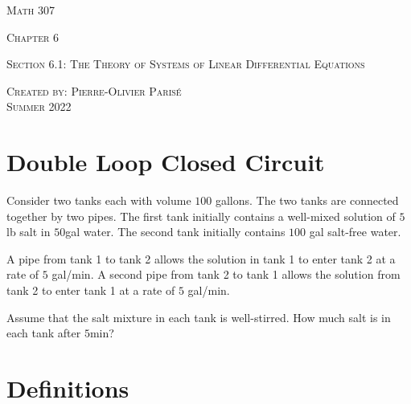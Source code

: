 \documentclass[12pt,a4paper]{article}
\newcounter{example}[section]
\begin{document}
\thispagestyle{empty}

\begin{center}
\vspace*{2.5cm}

{\Huge \textsc{Math 307}}

\vspace*{2cm}

{\LARGE \textsc{Chapter 6}} 

\vspace*{0.75cm}

\noindent\textsc{Section 6.1: The Theory of Systems of Linear Differential Equations}

\vspace*{0.75cm}

\tableofcontents

\vfill

\noindent \textsc{Created by: Pierre-Olivier Paris{\'e}} \\
\textsc{Summer 2022}
\end{center}

\newpage

\section{Double Loop Closed Circuit}

\begin{example}
Consider two tanks each with volume $100$ gallons. The two tanks are connected together by two pipes. The first tank initially contains a well-mixed solution of $5$lb salt in $50$gal water. The second tank initially contains $100$ gal salt-free water. 

A pipe from tank 1 to tank 2 allows the solution in tank 1 to enter tank 2 at a rate of $5$ gal/min. A second pipe from tank 2 to tank 1 allows the solution from tank 2 to enter tank 1 at a rate of $5$ gal/min.

Assume that the salt mixture in each tank is well-stirred. How much salt is in each tank after $5$min?
\end{example}

\newpage

\section{Definitions}
\end{document}
